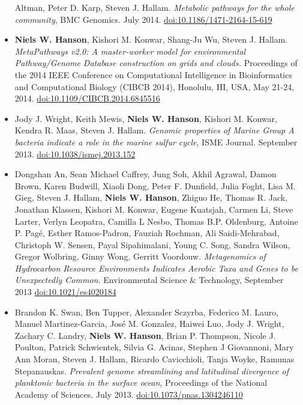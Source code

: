\documentclass[print]{hanson_cv} %
\begin{document}
\begin{itemize}
  Altman, Peter D. Karp, Steven J. Hallam. \emph{Metabolic pathways for
  the whole community}, BMC Genomics. July 2014.
  \href{http://dx.doi.org/10.1186/1471-2164-15-619}{doi:10.1186/1471-2164-15-619}
\item
  \textbf{Niels W. Hanson}, Kishori M. Konwar, Shang-Ju Wu, Steven J.
  Hallam. \emph{MetaPathways v2.0: A master-worker model for
  environmental Pathway/Genome Database construction on grids and
  clouds.} Proceedings of the 2014 IEEE Conference on Computational
  Intelligence in Bioinformatics and Computational Biology (CIBCB 2014),
  Honolulu, HI, USA, May 21-24, 2014.
  \href{http://ieeexplore.ieee.org/xpl/articleDetails.jsp?arnumber=6845516}{doi:10.1109/CIBCB.2014.6845516}
\item
  Jody J. Wright, Keith Mewis, \textbf{Niels W. Hanson}, Kishori M.
  Konwar, Kendra R. Maas, Steven J. Hallam. \emph{Genomic properties of
  Marine Group A bacteria indicate a role in the marine sulfur cycle},
  ISME Journal. September 2013.
  \href{http://dx.doi.org/10.1038/ismej.2013.152}{doi:10.1038/ismej.2013.152}
\item
  Dongshan An, Sean Michael Caffrey, Jung Soh, Akhil Agrawal, Damon
  Brown, Karen Budwill, Xiaoli Dong, Peter F. Dunfield, Julia Foght,
  Lisa M. Gieg, Steven J. Hallam, \textbf{Niels W. Hanson}, Zhiguo He,
  Thomas R. Jack, Jonathan Klassen, Kishori M. Konwar, Eugene Kuatsjah,
  Carmen Li, Steve Larter, Verlyn Leopatra, Camilla L Nesbo, Thomas B.P.
  Oldenburg, Antoine P. Pag\'{e}, Esther Ramos-Padron, Fauziah Rochman, Ali
  Saidi-Mehrabad, Christoph W. Sensen, Payal Sipahimalani, Young C.
  Song, Sandra Wilson, Gregor Wolbring, Ginny Wong, Gerritt Voordouw.
   \emph{Metagenomics of Hydrocarbon Resource Environments Indicates Aerobic
  Taxa and Genes to be Unexpectedly Common.} Environmental Science
  \& Technology, September 2013
  \href{http://dx.doi.org/10.1021/es4020184}{doi:10.1021/es4020184}
\item
  Brandon K. Swan, Ben Tupper, Alexander Sczyrba, Federico M. Lauro,
  Manuel Martinez-Garcia, Jos\'{e} M. Gonzalez, Haiwei Luo, Jody J. Wright,
  Zachary C. Landry, \textbf{Niels W. Hanson}, Brian P. Thompson, Nicole
  J. Poulton, Patrick Schwientek, Silvia G. Acinas, Stephen J
  Giovannoni, Mary Ann Moran, Steven J. Hallam, Ricardo Cavicchioli,
  Tanja Woyke, Ramunas Stepanauskas. \emph{Prevalent genome streamlining
  and latitudinal divergence of planktonic bacteria in the surface
  ocean}, Proceedings of the National Academy of Sciences. July 2013.
  \href{http://dx.doi.org/10.1073/pnas.1304246110}{doi:10.1073/pnas.1304246110}

\end{itemize}
\end{document}
